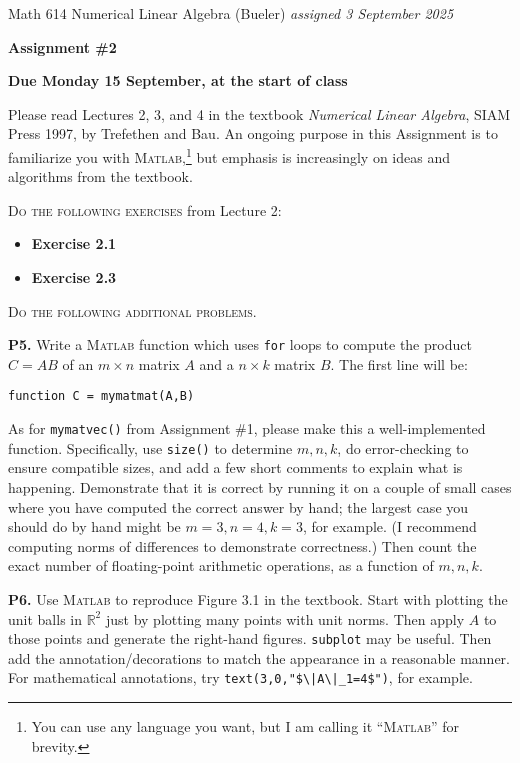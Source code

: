 \documentclass[12pt]{amsart}
\newcommand{\RR}{\mathbb{R}}
\newcommand{\prob}[1]{\bigskip\noindent\textbf{#1.}\quad }
\newcommand{\Matlab}{\textsc{Matlab}\xspace}
\begin{document}
\scriptsize \noindent Math 614 Numerical Linear Algebra (Bueler) \hfill \emph{assigned 3 September 2025}
\normalsize\medskip

\Large\centerline{\textbf{Assignment \#2}}
\large
\medskip

\centerline{\textbf{Due Monday 15 September, at the start of class}}
\medskip
\normalsize

\thispagestyle{empty}

\bigskip

\noindent Please read Lectures 2, 3, and 4 in the textbook \emph{Numerical Linear Algebra}, SIAM Press 1997, by Trefethen and Bau.  An ongoing purpose in this Assignment is to familiarize you with \Matlab,\footnote{You can use any language you want, but I am calling it ``\Matlab'' for brevity.} but emphasis is increasingly on ideas and algorithms from the textbook.

\bigskip
\noindent \textsc{Do the following exercises} from Lecture 2:

\begin{itemize}
\item \textbf{Exercise 2.1}
\item \textbf{Exercise 2.3}
\end{itemize}


\medskip
\noindent \textsc{Do the following additional problems.}

\prob{P5}  Write a \Matlab function which uses \texttt{for} loops to compute the product $C=AB$ of an $m\times n$ matrix $A$ and a $n\times k$ matrix $B$.  The first line will be:

\centerline{\texttt{function C = mymatmat(A,B)}}

\noindent As for \texttt{mymatvec()} from Assignment \#1, please make this a well-implemented function.  Specifically, use \texttt{size()} to determine $m,n,k$, do error-checking to ensure compatible sizes, and add a few short comments to explain what is happening.  Demonstrate that it is correct by running it on a couple of small cases where you have computed the correct answer by hand; the largest case you should do by hand might be $m=3,n=4,k=3$, for example.  (I recommend computing norms of differences to demonstrate correctness.)  Then count the exact number of floating-point arithmetic operations, as a function of $m,n,k$.


\prob{P6}  Use \Matlab to reproduce Figure 3.1 in the textbook.  Start with plotting the unit balls in $\RR^2$ just by plotting many points with unit norms.  Then apply $A$ to those points and generate the right-hand figures.  \verb|subplot| may be useful.  Then add the annotation/decorations to match the appearance in a reasonable manner.  For mathematical annotations, try \verb#text(3,0,"$\|A\|_1=4$")#, for example.
\end{document}
